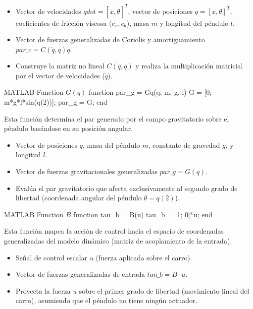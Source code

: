 \documentclass[11pt,fleqn]{book} %
\begin{document}
\begin{itemize}[leftmargin=1.5cm]
	\item[\textbf{Entradas:}] Vector de velocidades $qdot = [\dot{x}, \dot{\theta}]^T$, vector de posiciones $q = [x, \theta]^T$, coeficientes de fricción viscosa ($c_x, c_\theta$), masa $m$ y longitud del péndulo $l$.
	\item[\textbf{Salidas:}] Vector de fuerzas generalizadas de Coriolis y amortiguamiento $par\_c = C(\dot{q}, q)\dot{q}$.
	\item[\textbf{Operación:}] Construye la matriz no lineal $C(\dot{q}, q)$ y realiza la multiplicación matricial por el vector de velocidades ($\dot{q}$).
\end{itemize}
\newpage
\begin{matlabbox}{{MATLAB Function $G(q)$}}
	function par_g = Gq(q, m, g, l)
		G = [0; m*g*l*sin(q(2))];
		par_g = G;
	end
\end{matlabbox}
Esta función determina el par generado por el campo gravitatorio sobre el péndulo basándose en su posición angular.

\begin{itemize}[leftmargin=1.5cm]
	\item[\textbf{Entradas:}] Vector de posiciones $q$, masa del péndulo $m$, constante de gravedad $g$, y longitud $l$.
	\item[\textbf{Salidas:}] Vector de fuerzas gravitacionales generalizadas $par\_g = G(q)$.
	\item[\textbf{Operación:}] Evalúa el par gravitatorio que afecta exclusivamente al segundo grado de libertad (coordenada angular del péndulo $\theta = q(2)$).
\end{itemize}

\begin{matlabbox}{{MATLAB Function $B$}}
	function tau_b = B(u)
		tau_b = [1; 0]*u;
	end
\end{matlabbox}
Esta función mapea la acción de control hacia el espacio de coordenadas generalizadas del modelo dinámico (matriz de acoplamiento de la entrada).

\begin{itemize}[leftmargin=1.5cm]
	\item[\textbf{Entradas:}] Señal de control escalar $u$ (fuerza aplicada sobre el carro).
	\item[\textbf{Salidas:}] Vector de fuerzas generalizadas de entrada $tau\_b = B \cdot u$.
	\item[\textbf{Operación:}] Proyecta la fuerza $u$ sobre el primer grado de libertad (movimiento lineal del carro), asumiendo que el péndulo no tiene ningún actuador.
\end{itemize}
\end{document}
